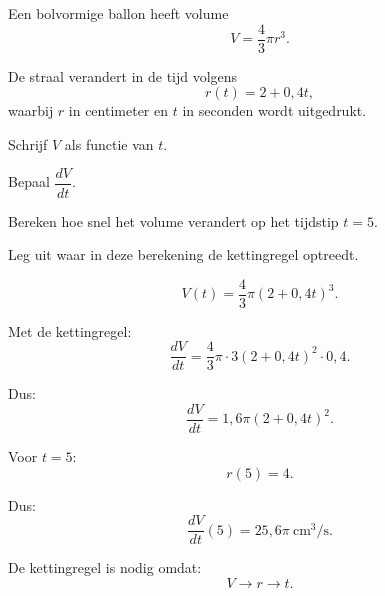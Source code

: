 \documentclass{ximera}
\begin{document}
\begin{oefening}{\oefU\ESS}

Een bolvormige ballon heeft volume
\[
V=\frac{4}{3}\pi r^3.
\]

De straal verandert in de tijd volgens
\[
r(t)=2+0{,}4t,
\]
waarbij $r$ in centimeter en $t$ in seconden wordt uitgedrukt.

\begin{question}
Schrijf $V$ als functie van $t$.
\end{question}

\begin{question}
Bepaal $\dfrac{dV}{dt}$.
\end{question}

\begin{question}
Bereken hoe snel het volume verandert op het tijdstip $t=5$.
\end{question}

\begin{question}
Leg uit waar in deze berekening de kettingregel optreedt.
\end{question}

\begin{oplossing}

\[
V(t)=\frac{4}{3}\pi(2+0{,}4t)^3.
\]

Met de kettingregel:
\[
\frac{dV}{dt}
=
\frac{4}{3}\pi\cdot3(2+0{,}4t)^2\cdot0{,}4.
\]

Dus:
\[
\boxed{\frac{dV}{dt}=1{,}6\pi(2+0{,}4t)^2.}
\]

Voor $t=5$:
\[
r(5)=4.
\]

Dus:
\[
\boxed{\frac{dV}{dt}(5)=25{,}6\pi\ \mathrm{cm^3/s}.}
\]

De kettingregel is nodig omdat:
\[
V\longrightarrow r\longrightarrow t.
\]

\end{oplossing}

\end{oefening}
\end{document}
